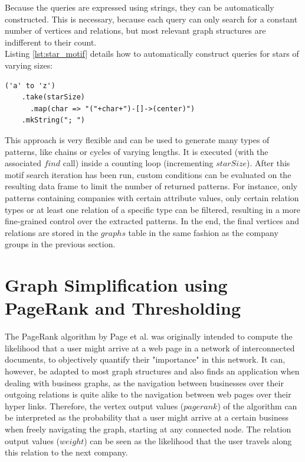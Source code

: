 \documentclass[
        a4paper,     %
        titlepage,   %
        oneside,     %
        parskip      %
]{scrartcl}          %
\begin{document}
  Because the queries are expressed using strings, they can be automatically constructed.
  This is necessary, because each query can only search for a constant number of
  vertices and relations, but most relevant graph structures are indifferent
  to their count.\\
  Listing \ref{lst:star_motif} details how to automatically construct queries for
  stars of varying sizes:

  \begin{lstlisting}[style=scalaStyle,caption=Star Motif Query Creation,label=lst:star_motif]
  ('a' to 'z')
    .take(starSize)
	  .map(char => "("+char+")-[]->(center)")
    .mkString("; ")
  \end{lstlisting}

  This approach is very flexible and can be used to generate many types of patterns,
  like chains or cycles of varying lengths. It is executed (with the associated $find$ call)
  inside a counting loop (incrementing $starSize$).
  After this motif search iteration has been run,
  custom conditions can be evaluated on the resulting data frame to limit
  the number of returned patterns. For instance, only patterns containing companies
  with certain attribute values, only certain relation types or at least
  one relation of a specific type can be filtered, resulting in a more fine-grained control
  over the extracted patterns.
  In the end, the final vertices and relations are stored in the $graphs$ table in the same
  fashion as the company groups in the previous section.

  \section{Graph Simplification using PageRank and Thresholding}
  \label{sec:graph_simplification}
  The PageRank algorithm by Page et al. \cite{pagerank1999} was originally intended
  to compute the likelihood that a user might arrive at a web page
  in a network of interconnected documents, to objectively quantify their "importance" in this network.
  It can, however, be adapted to most
  graph structures and also finds an application when dealing with business graphs,
  as the navigation between businesses over their outgoing relations is quite
  alike to the navigation between web pages over their hyper links.
  Therefore, the vertex output values ($pagerank$) of the algorithm can be interpreted as the
  probability that a user might arrive at a certain business when freely
  navigating the graph, starting at any connected node.
  The relation output values ($weight$) can be seen as the likelihood that the user
  travels along this relation to the next company.
\end{document}
